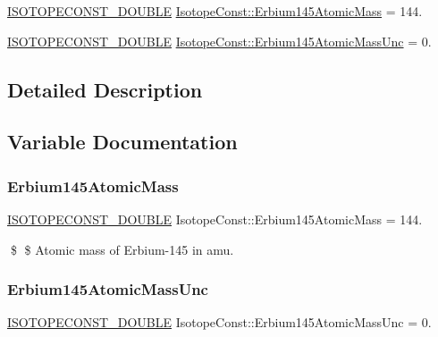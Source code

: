 \begin{DoxyCompactItemize}
\item 
\mbox{\hyperlink{group___isotope_const-_macros_ga8f45a7272ce02c0b4c65c44636ed719a}{I\+S\+O\+T\+O\+P\+E\+C\+O\+N\+S\+T\+\_\+\+D\+O\+U\+B\+LE}} \mbox{\hyperlink{group___isotope_const-_erbium-_er145_ga4cf2ce965115ff2eb13309c66e478ccf}{Isotope\+Const\+::\+Erbium145\+Atomic\+Mass}} = 144.
\item 
\mbox{\hyperlink{group___isotope_const-_macros_ga8f45a7272ce02c0b4c65c44636ed719a}{I\+S\+O\+T\+O\+P\+E\+C\+O\+N\+S\+T\+\_\+\+D\+O\+U\+B\+LE}} \mbox{\hyperlink{group___isotope_const-_erbium-_er145_ga076fe0f73a44fcb6579f3a1ddba24bc4}{Isotope\+Const\+::\+Erbium145\+Atomic\+Mass\+Unc}} = 0.
\end{DoxyCompactItemize}


\subsection{Detailed Description}


\subsection{Variable Documentation}
\mbox{\label{group___isotope_const-_erbium-_er145_ga4cf2ce965115ff2eb13309c66e478ccf}} 
\subsubsection{\texorpdfstring{Erbium145\+Atomic\+Mass}{Erbium145AtomicMass}}
{\footnotesize\ttfamily \mbox{\hyperlink{group___isotope_const-_macros_ga8f45a7272ce02c0b4c65c44636ed719a}{I\+S\+O\+T\+O\+P\+E\+C\+O\+N\+S\+T\+\_\+\+D\+O\+U\+B\+LE}} Isotope\+Const\+::\+Erbium145\+Atomic\+Mass = 144.}

\$ \$ Atomic mass of Erbium-\/145 in amu. \mbox{\label{group___isotope_const-_erbium-_er145_ga076fe0f73a44fcb6579f3a1ddba24bc4}} 
\subsubsection{\texorpdfstring{Erbium145\+Atomic\+Mass\+Unc}{Erbium145AtomicMassUnc}}
{\footnotesize\ttfamily \mbox{\hyperlink{group___isotope_const-_macros_ga8f45a7272ce02c0b4c65c44636ed719a}{I\+S\+O\+T\+O\+P\+E\+C\+O\+N\+S\+T\+\_\+\+D\+O\+U\+B\+LE}} Isotope\+Const\+::\+Erbium145\+Atomic\+Mass\+Unc = 0.}

